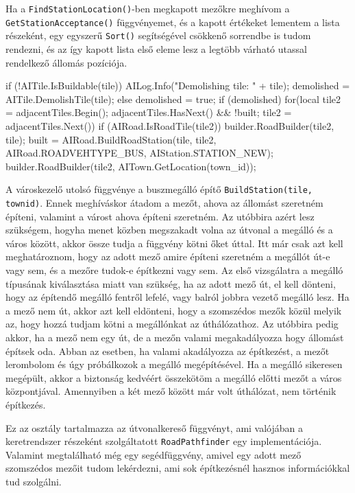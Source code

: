 Ha a \texttt{FindStationLocation()}-ben megkapott mezőkre meghívom a \\ \texttt{GetStationAcceptance()} függvényemet, és a kapott értékeket lementem a lista részeként, egy egyszerű \texttt{Sort()} segítségével csökkenő sorrendbe is tudom rendezni, és az így kapott lista első eleme lesz a legtöbb várható utassal rendelkező állomás pozíciója.

\begin{cpp}
if (!AITile.IsBuildable(tile)) {
  AILog.Info("Demolishing tile: " + tile);
  demolished = AITile.DemolishTile(tile);
} else {
  demolished = true;
}
if (demolished) {
  for(local tile2 = adjacentTiles.Begin(); 
   adjacentTiles.HasNext() && !built; tile2 = adjacentTiles.Next()) {
	if (AIRoad.IsRoadTile(tile2)) {
      builder.RoadBuilder(tile2, tile);
      built = AIRoad.BuildRoadStation(tile, tile2,
      AIRoad.ROADVEHTYPE_BUS, AIStation.STATION_NEW);
      builder.RoadBuilder(tile2, AITown.GetLocation(town_id));
    }
  }
}
\end{cpp}

A városkezelő utolsó függvénye a buszmegálló építő \texttt{BuildStation(tile, townid)}. Ennek meghíváskor átadom a mezőt, ahova az állomást szeretném építeni, valamint a várost ahova építeni szeretném. Az utóbbira azért lesz szükségem, hogyha menet közben megszakadt volna az útvonal a megálló és a város között, akkor össze tudja a függvény kötni őket úttal. Itt már csak azt kell meghatároznom, hogy az adott mező amire építeni szeretném a megállót út-e vagy sem, és a mezőre tudok-e építkezni vagy sem. Az első vizsgálatra a megálló típusának kiválasztása miatt van szükség, ha az adott mező út, el kell dönteni, hogy az építendő megálló fentről lefelé, vagy balról jobbra vezető megálló lesz. Ha a mező nem út, akkor azt kell eldönteni, hogy a szomszédos mezők közül melyik az, hogy hozzá tudjam kötni a megállónkat az úthálózathoz. Az utóbbira pedig akkor, ha a mező nem egy út, de a mezőn valami megakadályozza hogy állomást építsek oda. Abban az esetben, ha valami akadályozza az építkezést, a mezőt lerombolom és úgy próbálkozok a megálló megépítésével. Ha a megálló sikeresen megépült, akkor a biztonság kedvéért összekötöm a megálló előtti mezőt a város központjával. Amennyiben a két mező között már volt úthálózat, nem történik építkezés.


Ez az osztály tartalmazza az útvonalkereső függvényt, ami valójában a keretrendszer részeként szolgáltatott \texttt{RoadPathfinder} egy implementációja. Valamint megtalálható még egy segédfüggvény, amivel egy adott mező szomszédos mezőit tudom lekérdezni, ami sok építkezésnél hasznos információkkal tud szolgálni.

